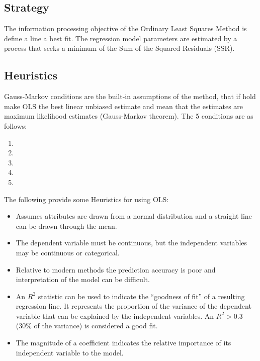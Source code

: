\subsection{Strategy}
The information processing objective of the Ordinary Least Squares Method is define a line a best fit.
The regression model parameters are estimated by a process that seeks a minimum of the Sum of the Squared Residuals (SSR).




\subsection{Heuristics}

Gauss-Markov conditions are the built-in assumptions of the method, that if hold make OLS the best linear unbiased estimate and mean that the estimates are maximum likelihood estimates (Gauss-Markov theorem). The 5 conditions are as follows:

\begin{enumerate}
	\item
	\item 
	\item 
	\item 
	\item 
\end{enumerate}

The following provide some Heuristics for using OLS:

\begin{itemize}
	\item Assumes attributes are drawn from a normal distribution and a straight line can be drawn through the mean.
	\item The dependent variable must be continuous, but the independent variables may be continuous or categorical.
	\item Relative to modern methods the prediction accuracy is poor and interpretation of the model can be difficult.
	\item An $R^2$ statistic can be used to indicate the ``goodness of fit'' of a resulting regression line. It represents the proportion of the variance of the dependent variable that can be explained by the independent variables. An $R^2>0.3$ (30\% of the variance) is considered a good fit.
	\item The magnitude of a coefficient indicates the relative importance of its independent variable to the model.
\end{itemize}


